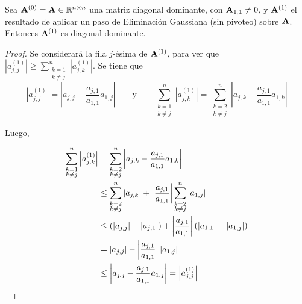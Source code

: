         \begin{lema}
            \label{lema:EG conserva diagonal dominante}
            Sea $\mathbf{A}^{(0)} = \mathbf{A} \in \mathbb{R}^{n \times n}$ una matriz diagonal dominante, con $\mathbf{A}_{1,1} \neq 0$, y $\mathbf{A}^{(1)}$ el resultado de aplicar un paso de Eliminación Gaussiana (sin pivoteo) sobre $\mathbf{A}$. Entonces $\mathbf{A}^{(1)}$ es diagonal dominante.
        \end{lema}
        \begin{proof}
            Se considerará la fila $j$-ésima de $\mathbf{A}^{(1)}$, para ver que $\left \vert a^{(1)}_{j,j} \right \vert \geq \sum_{\substack{k = 1 \\ k \neq j}}^n \left \vert a^{(1)}_{j,k} \right \vert$. Se tiene que
            \[ \left \vert a^{(1)}_{j,j} \right \vert = \left \vert a_{j,j} - \frac{a_{j,1}}{a_{1,1}} a_{1,j} \right \vert
                \qquad \text{y} \qquad
            \sum_{\substack{k = 1 \\ k \neq j}}^n \left \vert a^{(1)}_{j,k} \right \vert
                = \sum_{\substack{k = 2 \\ k \neq j}}^n \left \vert a_{j,k} - \frac{a_{j,1}}{a_{1,1}} a_{1,k} \right \vert \]

            Luego,

            \[ \begin{split}
                \sum_{\substack{k = 1 \\ k \neq j}}^n \left \vert a^{(1)}_{j,k} \right \vert
                &= \sum_{\substack{k = 2 \\ k \neq j}}^n \left \vert a_{j,k} - \frac{a_{j,1}}{a_{1,1}} a_{1,k} \right \vert \\
                &\leq \sum_{\substack{k = 2 \\ k \neq j}}^n \vert a_{j,k} \vert + \left \vert \frac{a_{j,1}}{a_{1,1}} \right \vert \sum_{\substack{k = 2 \\ k \neq j}}^n \vert a_{1,j} \vert \\
                &\leq \left( \vert a_{j,j} \vert - \vert a_{j,1} \vert \right) + \left \vert \frac{a_{j,1}}{a_{1,1}} \right \vert \left( \vert a_{1,1} \vert - \vert a_{1,j} \vert \right) \\
                &= \vert a_{j,j} \vert - \left \vert \frac{a_{j,1}}{a_{1,1}} \right \vert \vert a_{1,j} \vert \\
                &\leq \left \vert a_{j,j} -  \frac{a_{j,1}}{a_{1,1}} a_{1,j} \right \vert = \left \vert a^{(1)}_{j,j} \right \vert \qedhere
            \end{split} \]
        \end{proof}


